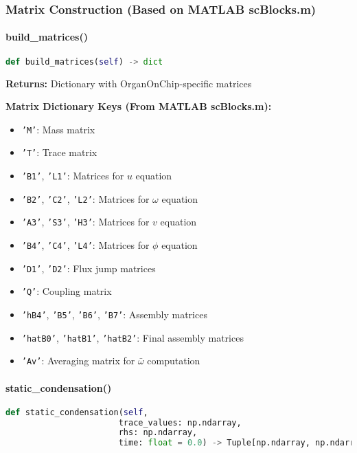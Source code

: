 \subsubsection{Matrix Construction (Based on MATLAB scBlocks.m)}

\paragraph{build\_matrices()}\leavevmode
\begin{lstlisting}[language=Python, caption=OrganOnChip Build Matrices]
def build_matrices(self) -> dict
\end{lstlisting}

\textbf{Returns:} Dictionary with OrganOnChip-specific matrices

\textbf{Matrix Dictionary Keys (From MATLAB scBlocks.m):}
\begin{itemize}
    \item \texttt{'M'}: Mass matrix
    \item \texttt{'T'}: Trace matrix
    \item \texttt{'B1'}, \texttt{'L1'}: Matrices for $u$ equation
    \item \texttt{'B2'}, \texttt{'C2'}, \texttt{'L2'}: Matrices for $\omega$ equation  
    \item \texttt{'A3'}, \texttt{'S3'}, \texttt{'H3'}: Matrices for $v$ equation
    \item \texttt{'B4'}, \texttt{'C4'}, \texttt{'L4'}: Matrices for $\phi$ equation
    \item \texttt{'D1'}, \texttt{'D2'}: Flux jump matrices
    \item \texttt{'Q'}: Coupling matrix
    \item \texttt{'hB4'}, \texttt{'B5'}, \texttt{'B6'}, \texttt{'B7'}: Assembly matrices
    \item \texttt{'hatB0'}, \texttt{'hatB1'}, \texttt{'hatB2'}: Final assembly matrices
    \item \texttt{'Av'}: Averaging matrix for $\bar{\omega}$ computation
\end{itemize}

\paragraph{static\_condensation()}\leavevmode
\begin{lstlisting}[language=Python, caption=OrganOnChip Static Condensation]
def static_condensation(self, 
                       trace_values: np.ndarray, 
                       rhs: np.ndarray, 
                       time: float = 0.0) -> Tuple[np.ndarray, np.ndarray, np.ndarray]
\end{lstlisting}

